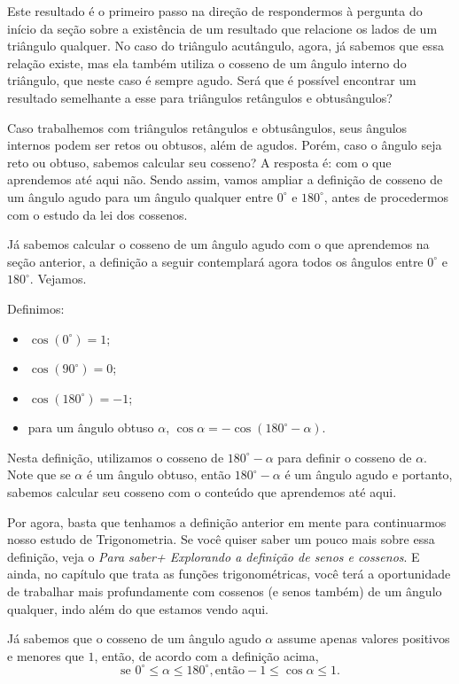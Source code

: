 Este resultado é o primeiro passo na direção de respondermos à pergunta do início da seção sobre a existência de um resultado que relacione os lados de um triângulo qualquer.
%
No caso do triângulo acutângulo, agora, já sabemos que essa relação existe, mas ela também utiliza o cosseno de um ângulo interno do triângulo, que neste caso é sempre agudo.
%
Será que é possível encontrar um resultado semelhante a esse para triângulos retângulos e obtusângulos? 

Caso trabalhemos com triângulos retângulos e obtusângulos, seus ângulos internos podem ser retos ou obtusos, além de agudos. 
%
Porém, caso o ângulo seja reto ou obtuso, sabemos calcular seu cosseno? 
%
A resposta é: com o que aprendemos até aqui não. 
%
Sendo assim, vamos ampliar a definição de cosseno de um ângulo agudo para um ângulo qualquer entre $0^\circ$ e $180^\circ$, antes de procedermos com o estudo da lei dos cossenos. 

Já sabemos calcular o cosseno de um ângulo agudo com o que aprendemos na seção anterior, a definição a seguir contemplará agora todos os ângulos entre $0^\circ$ e $180^\circ$. Vejamos.

Definimos:
\begin{itemize}[topsep=0pt, itemsep=0pt]
\item $\cos(0^\circ)=1$;
\item $\cos(90^\circ)=0$;
\item $\cos(180^\circ)=-1$;
\item para um ângulo obtuso $\alpha$, $\cos\alpha=-\cos(180^\circ-\alpha).$
\end{itemize}

Nesta definição, utilizamos o cosseno de $180^\circ-\alpha$ para definir o cosseno de $\alpha$. Note que se $\alpha$ é um ângulo obtuso, então $180^\circ-\alpha$ é um ângulo agudo e portanto, sabemos calcular seu cosseno com o conteúdo que aprendemos até aqui.

Por agora, basta que tenhamos a definição anterior em mente para continuarmos nosso estudo de Trigonometria. Se você quiser saber um pouco mais sobre essa definição, veja o \textit{Para saber+ Explorando a definição de senos e cossenos}. E ainda, no capítulo que trata as funções trigonométricas, você terá a oportunidade de trabalhar mais profundamente com cossenos (e senos também) de um ângulo qualquer, indo além do que estamos vendo aqui.

\begin{observation}{}
Já sabemos que o cosseno de um ângulo agudo $\alpha$ assume apenas valores positivos e menores que $1$, então, de acordo com a definição acima,  
$$\text{se }0^\circ \leq\alpha \leq180^\circ, \text{então} -1\leq\cos\alpha\leq 1.$$
\end{observation}

